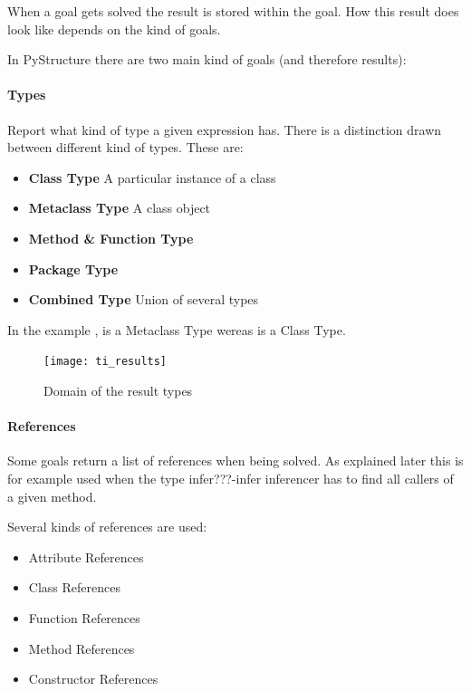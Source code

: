 \documentclass[12pt,halfparskip,DIV11,BCOR10mm]{scrreprt}
\begin{document}

When a goal gets solved the result is stored within the goal. How this result does look like depends on the kind of goals. 

In PyStructure there are two main kind of goals (and therefore results):

\paragraph{Types}

Report what kind of type a given expression has. There is a distinction drawn between different kind of types. These are:

\begin{itemize}
    \item \textbf{Class Type} A particular instance of a class
    \item \textbf{Metaclass Type} A class object
    \item \textbf{Method \& Function Type}
    \item \textbf{Package Type}
    \item \textbf{Combined Type} Union of several types
\end{itemize}

In the example ,  is a Metaclass Type wereas  is a Class Type.


\begin{figure}[H]
    \centering
    \texttt{[image: ti\_results]}
    \caption{Domain of the result types}
    \label{fig:ti_results}
\end{figure}

\paragraph{References}

Some goals return a list of references when being solved. As explained later this is for example used when the type infer???-infer inferencer has to find all callers of a given method.

Several kinds of references are used:

\begin{itemize}
	\item Attribute References
	\item Class References
	\item Function References
	\item Method References
	\item Constructor References
\end{itemize}
\end{document}
